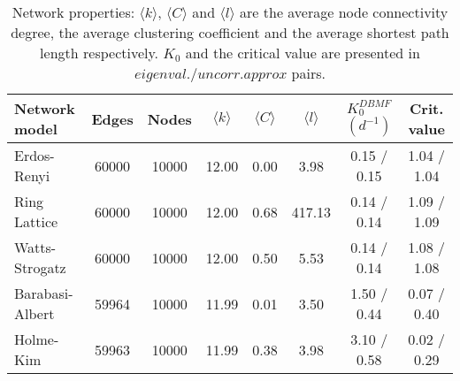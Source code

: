 \begin{table}[h]
\centering
\caption{Network properties: $\langle k \rangle$, $\langle C \rangle$ and $\langle l \rangle$ are the average node connectivity degree, the average clustering coefficient and the average shortest path length respectively. $K_0$ and the critical value are presented in $eigenval./uncorr. approx$ pairs.}
\label{tab:networks}
\begin{tabular}{lccccccc}
\toprule
         Network model &  Edges &  Nodes & $\langle k \rangle$ & $\langle C \rangle$ & $\langle l \rangle$ & $K_0^{DBMF}$ $(d^{-1})$ & Crit. value \\ 
\midrule
     Erdos-Renyi &  60000 &  10000 & 12.00 &  0.00 &    3.98 & 	  0.15 / 0.15 &   1.04 / 1.04 \\
    Ring Lattice &  60000 &  10000 & 12.00 &  0.68 &  417.13 &    0.14 / 0.14 &   1.09 / 1.09 \\
  Watts-Strogatz &  60000 &  10000 & 12.00 &  0.50 &    5.53 &    0.14 / 0.14 &   1.08 / 1.08 \\
 Barabasi-Albert &  59964 &  10000 & 11.99 &  0.01 &    3.50 &    1.50 / 0.44 &   0.07 / 0.40\\
       Holme-Kim &  59963 &  10000 & 11.99 &  0.38 &    3.98 &    3.10 / 0.58 &   0.02 / 0.29\\
\bottomrule
\end{tabular}
\end{table}
